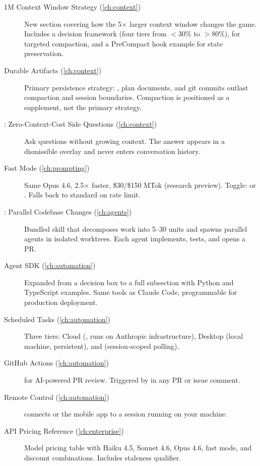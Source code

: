 \begin{description}
  \item[1M Context Window Strategy (\cref{ch:context})]
    New section covering how the 5$\times$ larger context window changes the game.
    Includes a decision framework (four tiers from $<$30\% to $>$80\%),
     for targeted compaction,
    and a PreCompact hook example for state preservation.

  \item[Durable Artifacts (\cref{ch:context})]
    Primary persistence strategy: , plan documents,
    and git commits outlast compaction and session boundaries.
    Compaction is positioned as a supplement, not the primary strategy.

  \item[: Zero-Context-Cost Side Questions (\cref{ch:context})]
    Ask questions without growing context.
    The answer appears in a dismissible overlay and never enters conversation history.

  \item[Fast Mode (\cref{ch:prompting})]
    Same Opus 4.6, 2.5$\times$ faster, \$30/\$150 MTok (research preview).
    Toggle:  or . Falls back to standard on rate limit.

  \item[: Parallel Codebase Changes (\cref{ch:agents})]
    Bundled skill that decomposes work into 5--30 units and spawns parallel
    agents in isolated worktrees. Each agent implements, tests, and opens a PR.

  \item[Agent SDK (\cref{ch:automation})]
    Expanded from a decision box to a full subsection with Python and TypeScript
    examples. Same tools as Claude Code, programmable for production deployment.

  \item[Scheduled Tasks (\cref{ch:automation})]
    Three tiers: Cloud (, runs on Anthropic infrastructure),
    Desktop (local machine, persistent), and  (session-scoped polling).

  \item[GitHub Actions (\cref{ch:automation})]
     for AI-powered PR review.
    Triggered by  in any PR or issue comment.

  \item[Remote Control (\cref{ch:automation})]
     connects  or the mobile app
    to a session running on your machine.

  \item[API Pricing Reference (\cref{ch:enterprise})]
    Model pricing table with Haiku 4.5, Sonnet 4.6, Opus 4.6, fast mode,
    and discount combinations. Includes staleness qualifier.
\end{description}

